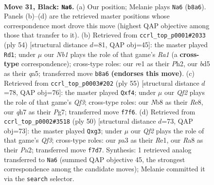\documentclass[11pt]{article}
\begin{document}
\clearpage

\begin{figure}[p]\centering
\begin{subfigure}{0.46\textwidth}\centering
\resizebox{\linewidth}{!}{%
\newchessgame
\chessboard[
  setfen={rn3k2/pp3qpQ/5P2/2PB2B1/8/P5P1/1P3P2/2R1R1K1 b - - 0 31},
  showmover=false,
  pgfstyle=straightmove, color=movearrow, markmove={b8-a6}
]}
\caption{}
\end{subfigure}\hfill
\begin{subfigure}{0.46\textwidth}\centering
\resizebox{\linewidth}{!}{%
\newchessgame
\chessboard[
  setfen={5rk1/1p3pp1/3p4/qB1bP2Q/P7/8/1P3KPP/R7 w - - 0 28},
  showmover=false,
  pgfstyle=straightmove, color=movearrow, markmove={a1-d1}
]}
\caption{}
\end{subfigure}
\\[4pt]
\begin{subfigure}{0.46\textwidth}\centering
\resizebox{\linewidth}{!}{%
\newchessgame
\chessboard[
  setfen={1r2r2k/2p2pp1/5q2/3P4/5Q2/3B1nP1/5P1P/R4R1K b - - 0 28},
  showmover=false,
  pgfstyle=straightmove, color=movearrow, markmove={f6-f4}
]}
\caption{}
\end{subfigure}\hfill
\begin{subfigure}{0.46\textwidth}\centering
\resizebox{\linewidth}{!}{%
\newchessgame
\chessboard[
  setfen={3r1rk1/pB5p/4b1pP/8/3q4/5Qp1/P1R2P2/4R1K1 w - - 0 26},
  showmover=false,
  pgfstyle=straightmove, color=movearrow, markmove={f3-g3}
]}
\caption{}
\end{subfigure}
\caption{\textbf{Move 31, Black: \texttt{Na6}.} (a) Our position; Melanie plays \texttt{Na6} (\texttt{b8a6}). Panels (b)--(d) are the retrieved master positions whose correspondence most drove this move (highest QAP objective among those that transfer to it). (b) Retrieved from \texttt{ccrl\_top\_p0001\#2033} (ply 54) [structural distance $d$=81, QAP obj=45]: the master played \texttt{Rd1}; under $\mu$ our \emph{Nb1} plays the role of that game's \emph{Ra1} (a \textbf{cross-type} correspondence); cross-type roles: our \emph{r}e1 as their \emph{P}h2, our \emph{b}d5 as their \emph{q}a5; transferred move \texttt{b8a6} \textbf{(endorses this move)}. (c) Retrieved from \texttt{ccrl\_top\_p0003\#202} (ply 55) [structural distance $d$=78, QAP obj=76]: the master played \texttt{Qxf4}; under $\mu$ our \emph{Qf2} plays the role of that game's \emph{Qf3}; cross-type roles: our \emph{N}b8 as their \emph{R}e8, our \emph{q}h7 as their \emph{P}g7; transferred move \texttt{f7f6}. (d) Retrieved from \texttt{ccrl\_top\_p0002\#3518} (ply 50) [structural distance $d$=73, QAP obj=73]: the master played \texttt{Qxg3}; under $\mu$ our \emph{Qf2} plays the role of that game's \emph{Qf3}; cross-type roles: our \emph{p}a3 as their \emph{R}e1, our \emph{R}a8 as their \emph{P}a2; transferred move \texttt{f7d7}. Synthesis: 1 retrieved analog transferred to \texttt{Na6} (summed QAP objective 45, the strongest correspondence among the candidate moves); Melanie committed it via the \texttt{search} selector.}
\label{fig:thought-m61}
\end{figure}
\end{document}
